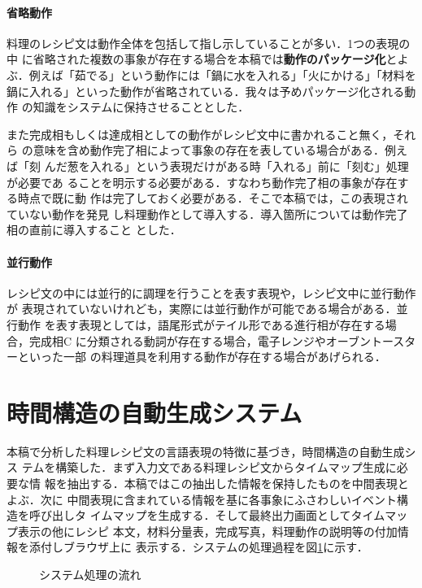 \paragraph{省略動作}
料理のレシピ文は動作全体を包括して指し示していることが多い．1つの表現の中
に省略された複数の事象が存在する場合を本稿では{\bf 動作のパッケージ化}とよ
ぶ．例えば「茹でる」という動作には「鍋に水を入れる」「火にかける」「材料を
鍋に入れる」といった動作が省略されている．我々は予めパッケージ化される動作
の知識をシステムに保持させることとした．

また完成相もしくは達成相としての動作がレシピ文中に書かれること無く，それら
の意味を含め動作完了相によって事象の存在を表している場合がある．例えば「刻
んだ葱を入れる」という表現だけがある時「入れる」前に「刻む」処理が必要であ
ることを明示する必要がある．すなわち動作完了相の事象が存在する時点で既に動
作は完了しておく必要がある．そこで本稿では，この表現されていない動作を発見
し料理動作として導入する．導入箇所については動作完了相の直前に導入すること
とした．

\paragraph{並行動作}
レシピ文の中には並行的に調理を行うことを表す表現や，レシピ文中に並行動作が
表現されていないけれども，実際には並行動作が可能である場合がある．並行動作
を表す表現としては，語尾形式がテイル形である進行相が存在する場合，完成相C
に分類される動詞が存在する場合，電子レンジやオーブントースターといった一部
の料理道具を利用する動作が存在する場合があげられる．


\section{時間構造の自動生成システム}

本稿で分析した料理レシピ文の言語表現の特徴に基づき，時間構造の自動生成シス
テムを構築した．まず入力文である料理レシピ文からタイムマップ生成に必要な情
報を抽出する．本稿ではこの抽出した情報を保持したものを中間表現とよぶ．次に
中間表現に含まれている情報を基に各事象にふさわしいイベント構造を呼び出しタ
イムマップを生成する．そして最終出力画面としてタイムマップ表示の他にレシピ
本文，材料分量表，完成写真，料理動作の説明等の付加情報を添付しブラウザ上に
表示する．システムの処理過程を図\ref{fig:6}に示す．

\begin{figure}[htbp]
  \begin{center}
\caption{システム処理の流れ}\label{fig:6}
\end{center}
\end{figure}

